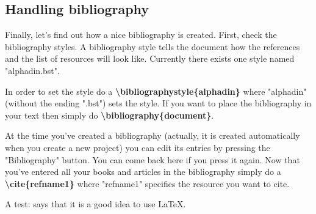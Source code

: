 \documentclass{article}
\begin{document}
\subsection{Handling bibliography}

Finally, let's find out how a nice bibliography is created. First, check the bibliography styles. A bibliography style tells the document how the references and the list of resources will look like. Currently there exists one style named "alphadin.bst".

In order to set the style do a \textbf{\textbackslash bibliographystyle\{alphadin\}} where "alphadin" (without the ending ".bst") sets the style. If you want to place the bibliography in your text then simply do \textbf{\textbackslash bibliography\{document\}}.

At the time you've created a bibliography (actually, it is created automatically when you create a new project) you can edit its entries by pressing the "Bibliography" button. You can come back here if you press it again. Now that you've entered all your books and articles in the bibliography simply do a \textbf{\textbackslash cite\{refname1\}} where "refname1" specifies the resource you want to cite.

A test: \cite{referenceName1} says that it is a good idea to use LaTeX.



\end{document}
